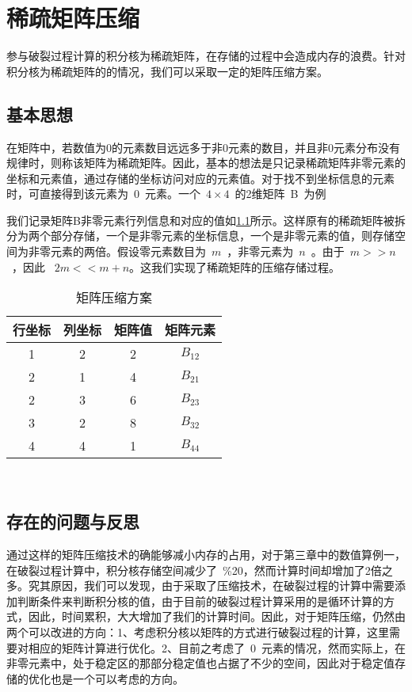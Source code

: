         \appendix
\chapter{稀疏矩阵压缩}

\indent 参与破裂过程计算的积分核为稀疏矩阵，在存储的过程中会造成内存的浪费。针对积分核为稀疏矩阵的的情况，我们可以采取一定的矩阵压缩方案。

\section{基本思想}
\indent 在矩阵中，若数值为0的元素数目远远多于非0元素的数目，并且非0元素分布没有规律时，则称该矩阵为稀疏矩阵。因此，基本的想法是只记录稀疏矩阵非零元素的坐标和元素值，通过存储的坐标访问对应的元素值。对于找不到坐标信息的元素时，可直接得到该元素为~0~元素。一个~$4 \times 4$~的2维矩阵~B~为例

 我们记录矩阵B非零元素行列信息和对应的值如\ref{juzhen-yasuo}所示。这样原有的稀疏矩阵被拆分为两个部分存储，一个是非零元素的坐标信息，一个是非零元素的值，则存储空间为非零元素的两倍。假设零元素数目为~$m$~，非零元素为~$n$~。由于~$m>>n$~，因此 ~$2m<<m+n$。这我们实现了稀疏矩阵的压缩存储过程。

\begin{table}
\centering  
\caption{矩阵压缩方案} \label{juzhen-yasuo} 
\begin{tabular}{|c|c|c|c|}
 \hline
行坐标&列坐标& 矩阵值& 矩阵元素\\
 \hline
1 & 2 & 2& $B_{12}$ \\
 \hline
2&1 & 4 &  $B_{21}$\\
 \hline
2 & 3 & 6& $B_{23}$\\
 \hline
3 & 2 & 8& $B_{32}$ \\
 \hline
4 & 4 & 1& $B_{44}$ \\
\hline
\end{tabular}\\
\end{table}


 \section{存在的问题与反思}
 \indent 通过这样的矩阵压缩技术的确能够减小内存的占用，对于第三章中的数值算例一，在破裂过程计算中，积分核存储空间减少了~\%20，然而计算时间却增加了2倍之多。究其原因，我们可以发现，由于采取了压缩技术，在破裂过程的计算中需要添加判断条件来判断积分核的值，由于目前的破裂过程计算采用的是循环计算的方式，因此，时间累积，大大增加了我们的计算时间。因此，对于矩阵压缩，仍然由两个可以改进的方向：1、考虑积分核以矩阵的方式进行破裂过程的计算，这里需要对相应的矩阵计算进行优化。2、目前之考虑了~0~元素的情况，然而实际上，在非零元素中，处于稳定区的那部分稳定值也占据了不少的空间，因此对于稳定值存储的优化也是一个可以考虑的方向。
 
